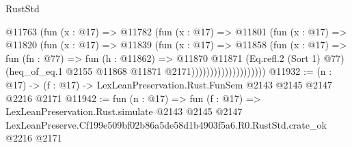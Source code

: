 \begin{lexlean}{RustStd}
\begin{coremodule}
                            @11763
                              (fun (x : @17) =>
                              @11782
                                (fun (x : @17) =>
                                @11801
                                  (fun (x : @17) =>
                                  @11820
                                    (fun (x : @17) =>
                                    @11839
                                      (fun (x : @17) =>
                                      @11858
                                        (fun (x : @17) =>
                                        fun (fn : @77) =>
                                        fun (h : @11862) =>
                                        @11870
                                          @11871
                                          (Eq.refl.{2} (Sort 1) @77)
                                          (heq_of_eq.{1}
                                            @2155
                                            @11868
                                            @11871
                                            @2171))))))))))))))))))))
@11932 := (n : @17) -> (f : @17) -> LexLeanPreservation.Rust.FunSem @2143 @2145 @2147 @2216 @2171
@11942 := fun (n : @17) =>
  fun (f : @17) =>
  LexLeanPreservation.Rust.simulate
    @2143
    @2145
    @2147
    LexLeanPreserve.Cf199e509bf02b86a5de58d1b4903f5a6.R0.RustStd.crate_ok
    @2216
    @2171
\end{coremodule}
\end{lexlean}
